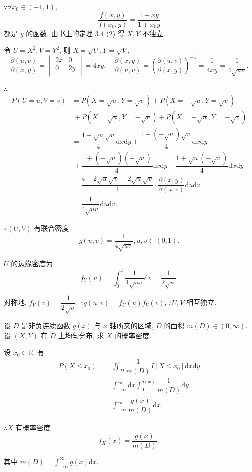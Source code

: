 \documentclass[color=black,device=normal,lang=cn]{elegantnote}
\numberwithin{equation}{section}
\theoremstyle{plain}
\numberwithin{exercise}{exsection}
\begin{document}
\begin{solution}
    $\because\forall x_0\in(-1,1)$,
    \[\dfrac{f(x,y)}{f(x_0,y)}=\dfrac{1+xy}{1+x_0y}\]
    都是 $y$ 的函数, 由书上的定理 3.4 (2) 得 $X,Y$ 不独立.

    令 $U=X^2,V=Y^2$, 则 $X=\sqrt{U},Y=\sqrt{V}$,
    \[\dfrac{\partial(u,v)}{\partial(x,y)}=\begin{vmatrix}
        2x & 0 \\
        0 & 2y \\
    \end{vmatrix}=4xy,\quad\dfrac{\partial(x,y)}{\partial(u,v)}=\left(\dfrac{\partial(u,v)}{\partial(x,y)}\right)^{-1}=\dfrac{1}{4xy}=\dfrac{1}{4\sqrt{uv}}.\]

    $\therefore$
    \begin{align*}
        P(U=u,V=v) & =P(X=\sqrt{u},Y=\sqrt{v})+P(X=-\sqrt{u},Y=\sqrt{v}) \\
        &\ +P(X=\sqrt{u},Y=-\sqrt{v})+P(X=-\sqrt{u},Y=-\sqrt{v}) \\
        & =\dfrac{1+\sqrt{u}\sqrt{v}}{4}\mathrm{d}x\mathrm{d}y+\dfrac{1+(-\sqrt{u})\sqrt{v}}{4}\mathrm{d}x\mathrm{d}y \\
        &\ +\dfrac{1+(-\sqrt{u})(-\sqrt{v})}{4}\mathrm{d}x\mathrm{d}y+\dfrac{1+\sqrt{u}(-\sqrt{v})}{4}\mathrm{d}x\mathrm{d}y \\
        & =\dfrac{4+2\sqrt{u}\sqrt{v}-2\sqrt{u}\sqrt{v}}{4}\cdot\dfrac{\partial(x,y)}{\partial(u,v)}\mathrm{d}u\mathrm{d}v \\
        & =\dfrac{1}{4\sqrt{uv}}\mathrm{d}u\mathrm{d}v.
    \end{align*}

    $\therefore(U,V)$ 有联合密度
    \[g(u,v)=\dfrac{1}{4\sqrt{uv}},u,v\in(0,1).\]

    $U$ 的边缘密度为
    \[f_U(u)=\int_0^1\dfrac{1}{4\sqrt{uv}}\mathrm{d}v=\dfrac{1}{2\sqrt{u}}.\]

    对称地, $f_V(v)=\dfrac{1}{2\sqrt{v}}$. $\because g(u,v)=f_U(u)f_V(v)$, $\therefore U,V$ 相互独立.
\end{solution}
\begin{exercise}%
    设 $D$ 是非负连续函数 $g(x)$ 与 $x$ 轴所夹的区域, $D$ 的面积 $m(D)\in(0,\infty)$. 设 $(X,Y)$ 在 $D$ 上均匀分布, 求 $X$ 的概率密度.
\end{exercise}
\begin{solution}
    设 $x_0\in\mathbb{R}$. 有
    \begin{align*}
        P(X\leq x_0) & =\iint_D\dfrac{1}{m(D)}I[X\leq x_0]\mathrm{d}x\mathrm{d}y \\
        & =\int_{-\infty}^{x_0}\mathrm{d}x\int_0^{g(x)}\dfrac{1}{m(D)}\mathrm{d}y \\
        & =\int_{-\infty}^{x_0}\dfrac{g(x)}{m(D)}\mathrm{d}x.
    \end{align*}

    $\therefore X$ 有概率密度
    \[f_X(x)=\dfrac{g(x)}{m(D)},\]

    其中 $m(D)=\int_{-\infty}^\infty g(x)\mathrm{d}x$.
\end{solution}
\end{document}
